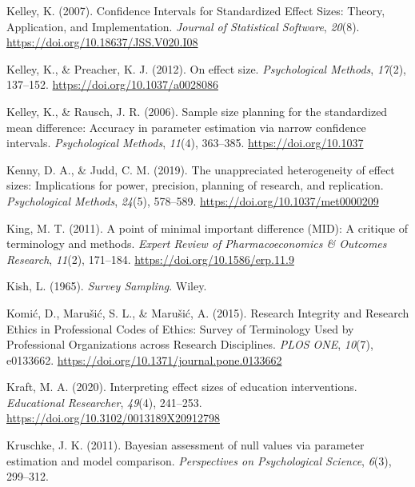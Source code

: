 \documentclass[
  letterpaper,
  DIV=11,
  numbers=noendperiod]{scrreprt}
\newlength{\cslhangindent}
\newlength{\cslentryspacingunit} %
\newenvironment{CSLReferences}[2] %
 {%
  \setlength{\parindent}{0pt}
  \ifodd #1
  \let\oldpar\par
  \def\par{\hangindent=\cslhangindent\oldpar}
  \fi
  \setlength{\parskip}{#2\cslentryspacingunit}
 }%
 {}
\begin{document}
\begin{CSLReferences}{1}{0}
\leavevmode{}%
Kelley, K. (2007). Confidence {Intervals} for {Standardized Effect
Sizes}: {Theory}, {Application}, and {Implementation}. \emph{Journal of
Statistical Software}, \emph{20}(8).
\url{https://doi.org/10.18637/JSS.V020.I08}

\leavevmode{}%
Kelley, K., \& Preacher, K. J. (2012). On effect size.
\emph{Psychological Methods}, \emph{17}(2), 137--152.
\url{https://doi.org/10.1037/a0028086}

\leavevmode{}%
Kelley, K., \& Rausch, J. R. (2006). Sample size planning for the
standardized mean difference: Accuracy in parameter estimation via
narrow confidence intervals. \emph{Psychological Methods}, \emph{11}(4),
363--385. \url{https://doi.org/10.1037}

\leavevmode{}%
Kenny, D. A., \& Judd, C. M. (2019). The unappreciated heterogeneity of
effect sizes: {Implications} for power, precision, planning of research,
and replication. \emph{Psychological Methods}, \emph{24}(5), 578--589.
\url{https://doi.org/10.1037/met0000209}

\leavevmode{}%
King, M. T. (2011). A point of minimal important difference ({MID}): A
critique of terminology and methods. \emph{Expert Review of
Pharmacoeconomics \& Outcomes Research}, \emph{11}(2), 171--184.
\url{https://doi.org/10.1586/erp.11.9}

\leavevmode{}%
Kish, L. (1965). \emph{Survey {Sampling}}. {Wiley}.

\leavevmode{}%
Komić, D., Marušić, S. L., \& Marušić, A. (2015). Research {Integrity}
and {Research Ethics} in {Professional Codes} of {Ethics}: {Survey} of
{Terminology Used} by {Professional Organizations} across {Research
Disciplines}. \emph{PLOS ONE}, \emph{10}(7), e0133662.
\url{https://doi.org/10.1371/journal.pone.0133662}

\leavevmode{}%
Kraft, M. A. (2020). Interpreting effect sizes of education
interventions. \emph{Educational Researcher}, \emph{49}(4), 241--253.
\url{https://doi.org/10.3102/0013189X20912798}

\leavevmode{}%
Kruschke, J. K. (2011). Bayesian assessment of null values via parameter
estimation and model comparison. \emph{Perspectives on Psychological
Science}, \emph{6}(3), 299--312.


\end{CSLReferences}
\end{document}
